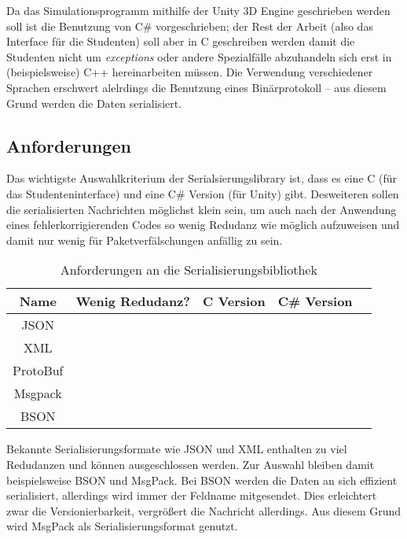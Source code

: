 Da das Simulationsprogramm mithilfe der Unity 3D Engine geschrieben werden soll ist die Benutzung von C\#
vorgeschrieben; der Rest der Arbeit (also das Interface f{\"{u}}r die Studenten) soll aber in C geschreiben werden
damit die Studenten nicht um \textit{exceptions} oder andere Spezialf{\"{a}}lle abzuhandeln sich erst in
(beispielsweise) C++ hereinarbeiten m{\"{u}}ssen. Die Verwendung verschiedener Sprachen erschwert alelrdings
die Benutzung eines Bin{\"{a}}rprotokoll -- aus diesem Grund werden die Daten serialisiert.


\subsection{Anforderungen}
Das wichtigste Auswahlkriterium der Serialsierungslibrary ist, dass es eine C (f{\"{u}}r das Studenteninterface) und eine C\# Version (f{\"{u}}r Unity) gibt.
Desweiteren sollen die serialisierten Nachrichten m{\"{o}}glichst klein sein, um auch nach der Anwendung
eines fehlerkorrigierenden Codes so wenig Redudanz wie m{\"{o}}glich aufzuweisen und damit nur wenig f{\"{u}}r Paketverf{\"{a}}lschungen anf{\"{a}}llig zu sein.

\begin{table}[h]
\centering
\begin{tabu}{c | c | c | c | p{5cm}}
	\toprule
	Name & Wenig Redudanz? & C Version & C\# Version \\
	\midrule
	JSON & \xmark & \checkmark & \checkmark \\
	XML & \xmark & \checkmark & \checkmark \\
	ProtoBuf & \checkmark & \xmark\footnotemark & \checkmark \\
	Msgpack\cite{msgpack} & \checkmark & \checkmark & \checkmark \\
	BSON & \checkmark & \checkmark & \checkmark \\
	\bottomrule
\end{tabu}
\caption{Anforderungen an die Serialisierungsbibliothek}
\end{table}

Bekannte Serialisierungsformate wie JSON und XML enthalten zu viel Redudanzen und k{\"{o}}nnen ausgeschlossen werden. Zur Auswahl bleiben damit beispielsweise BSON und MsgPack.
Bei BSON werden die Daten an sich effizient serialisiert, allerdings wird immer der Feldname mitgesendet. Dies erleichtert zwar die Versionierbarkeit, vergr{\"{o}}{\ss}ert
die Nachricht allerdings. Aus diesem Grund wird MsgPack als Serialisierungsformat genutzt.

